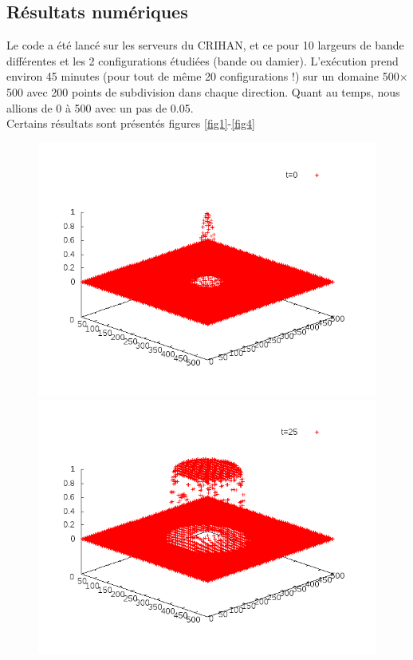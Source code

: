 \documentclass{article}
\begin{document}
\subsection{Résultats numériques}
Le code a été lancé sur les serveurs du CRIHAN, et ce pour 10 largeurs de bande différentes et les 2 configurations étudiées (bande ou damier). L'exécution prend environ 45 minutes (pour tout de même 20 configurations !) sur un domaine 500$\times$500 avec 200 points de subdivision dans chaque direction. Quant au temps, nous allions de 0 à 500 avec un pas de 0.05.\\
Certains résultats sont présentés figures \ref{fig1}-\ref{fig4}
\begin{figure}[!h]
\centering
	\includegraphics[scale=0.25]{img/anim1-10-1.png}
	\includegraphics[scale=0.25]{img/anim1-10-50.png}\\

\end{figure}
\end{document}
